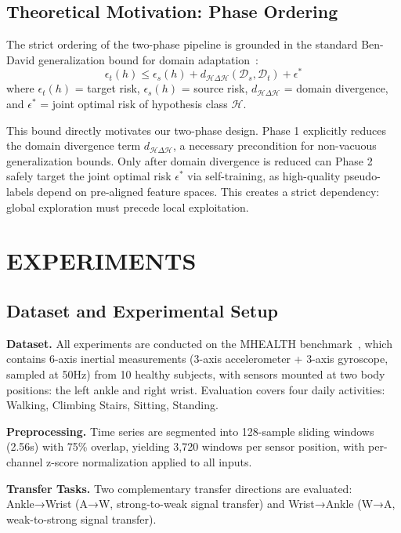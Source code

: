 \documentclass[conference]{IEEEtran}
\begin{document}
\subsection{Theoretical Motivation: Phase Ordering}
\label{sec:theory}
The strict ordering of the two-phase pipeline is grounded in the standard Ben-David generalization bound for domain adaptation~\cite{ben2010theory}:
\begin{equation}
    \epsilon_t(h) \leq \epsilon_s(h) + d_{\mathcal{H}\Delta\mathcal{H}}(\mathcal{D}_s, \mathcal{D}_t) + \epsilon^*
\label{eq:bound}
\end{equation}
where $\epsilon_t(h)$ = target risk, $\epsilon_s(h)$ = source risk, $d_{\mathcal{H}\Delta\mathcal{H}}$ = domain divergence, and $\epsilon^*$ = joint optimal risk of hypothesis class $\mathcal{H}$.

This bound directly motivates our two-phase design. Phase 1 explicitly reduces the domain divergence term $d_{\mathcal{H}\Delta\mathcal{H}}$, a necessary precondition for non-vacuous generalization bounds. Only after domain divergence is reduced can Phase 2 safely target the joint optimal risk $\epsilon^*$ via self-training, as high-quality pseudo-labels depend on pre-aligned feature spaces. This creates a strict dependency: global exploration must precede local exploitation.

\section{EXPERIMENTS}
\label{sec:experiments}

\subsection{Dataset and Experimental Setup}
\label{sec:setup}
\textbf{Dataset.} All experiments are conducted on the MHEALTH benchmark~\cite{banos2014mhealthdroid}, which contains 6-axis inertial measurements (3-axis accelerometer + 3-axis gyroscope, sampled at 50Hz) from 10 healthy subjects, with sensors mounted at two body positions: the left ankle and right wrist. Evaluation covers four daily activities: Walking, Climbing Stairs, Sitting, Standing.

\textbf{Preprocessing.} Time series are segmented into 128-sample sliding windows (2.56s) with 75\% overlap, yielding 3,720 windows per sensor position, with per-channel z-score normalization applied to all inputs.

\textbf{Transfer Tasks.} Two complementary transfer directions are evaluated: Ankle→Wrist (A→W, strong-to-weak signal transfer) and Wrist→Ankle (W→A, weak-to-strong signal transfer).
\end{document}
